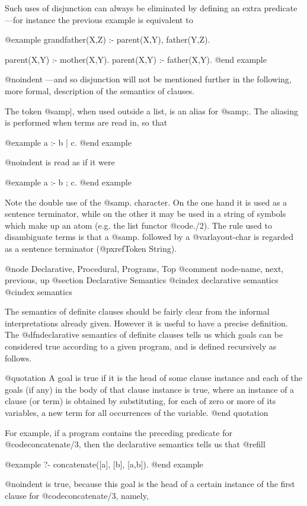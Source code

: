 {Such uses of disjunction can always be eliminated by defining an extra
predicate---for instance the previous example is equivalent to

@example
grandfather(X,Z) :- parent(X,Y), father(Y,Z).

parent(X,Y) :- mother(X,Y).
parent(X,Y) :- father(X,Y).
@end example

@noindent
---and so disjunction will not be mentioned further in the following,
more formal, description of the semantics of clauses.

The token @samp{|}, when used outside a list, is an alias for @samp{;}.
The aliasing is performed when terms are read in, so that

@example
a :- b | c.
@end example

@noindent
is read as if it were 

@example
a :- b ; c.
@end example

Note the double use of the @samp{.} character.  On the one hand it is
used as a sentence terminator, while on the other it may be used in a
string of symbols which make up an atom (e.g. the list functor
@code{./2}).  The rule used to disambiguate terms is that a @samp{.}
followed by a @var{layout-char} is regarded as a sentence terminator
(@pxref{Token String}).

@node Declarative, Procedural, Programs, Top
@comment  node-name,  next,  previous,  up
@section Declarative Semantics
@cindex declarative semantics
@cindex semantics

The semantics of definite clauses should be fairly clear from the
informal interpretations already given.  However it is useful to have a
precise definition.  The @dfn{declarative semantics} of definite clauses
tells us which goals can be considered true according to a given
program, and is defined recursively as follows.

@quotation
A goal is true if it is the head of some clause instance and each of the
goals (if any) in the body of that clause instance is true, where an
instance of a clause (or term) is obtained by substituting, for each of
zero or more of its variables, a new term for all occurrences of the
variable.
@end quotation

For example, if a program contains the preceding predicate for
@code{concatenate/3}, then the declarative semantics tells us that
@refill

@example
?- concatenate([a], [b], [a,b]).
@end example

@noindent
is true, because this goal is the head of a certain instance of the
first clause for @code{concatenate/3}, namely,

}
